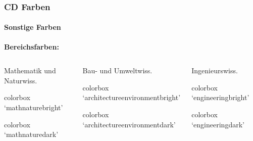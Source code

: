 \documentclass[german,notoc]{tudbeamer}%
\begin{document}
\begin{frame}
	\frametitle{CD Farben}
	\framesubtitle{Sonstige Farben}

	\textbf{Bereichsfarben:}
	\begin{columns}
		\begin{column}{.33\textwidth}
			Mathematik und Naturwiss.
			\begin{beamercolorbox}[wd=0.9\textwidth,sep=1em]{colorbox}
				\centering `mathnaturebright'
		    \end{beamercolorbox}
			\begin{beamercolorbox}[wd=0.9\textwidth,sep=1em]{colorbox}
				\centering `mathnaturedark'
		    \end{beamercolorbox}
		\end{column}
		\hspace{-.1\textwidth}\begin{column}{.33\textwidth}
			Bau- und Umweltwiss.
			\begin{beamercolorbox}[wd=0.9\textwidth,sep=1em]{colorbox}
				\centering `architectureenvironmentbright'
		    \end{beamercolorbox}
			\begin{beamercolorbox}[wd=0.9\textwidth,sep=1em]{colorbox}
				\centering `architectureenvironmentdark'
		    \end{beamercolorbox}
		\end{column}
		\hspace{-.1\textwidth}\begin{column}{.33\textwidth}
			Ingenieurswiss.
			\begin{beamercolorbox}[wd=0.9\textwidth,sep=1em]{colorbox}
				\centering `engineeringbright'
		    \end{beamercolorbox}
			\begin{beamercolorbox}[wd=0.9\textwidth,sep=1em]{colorbox}
				\centering `engineeringdark'
		    \end{beamercolorbox}
		\end{column}
	\end{columns}
	\begin{columns}
		\begin{column}{.33\textwidth}

\end{column}
\end{columns}
\end{frame}
\end{document}
